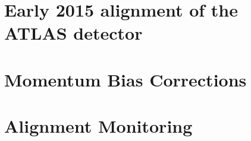 \section{Early 2015 alignment of the ATLAS detector}\label{align:2015}


%

\section{Momentum Bias Corrections}\label{align:bias}


\section{Alignment Monitoring}\label{align:monitoring}

